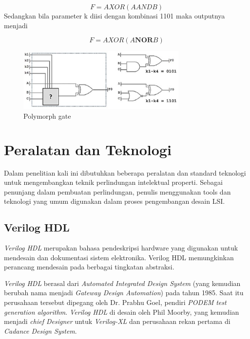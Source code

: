 \begin{equation}
	F = A XOR (A AND B)
\end{equation}
Sedangkan bila parameter k diisi dengan kombinasi 1101 maka outputnya menjadi

\begin{equation}
	F = A XOR (A \textbf{NOR} B)
\end{equation}

\begin{figure}
	\centering
	\includegraphics[width=0.75\textwidth]
	{pics/polymorphgate.png}
	\caption{Polymorph gate\cite{Chen2017a}}
	\label{fig:poly}
\end{figure}

% 

\section{Peralatan dan Teknologi}
Dalam penelitian kali ini dibutuhkan beberapa peralatan dan standard teknologi untuk mengembangkan teknik perlindungan intelektual properti. Sebagai penunjang dalam pembuatan perlindungan, penulis menggunakan tools dan teknologi yang umum digunakan dalam proses pengembangan desain LSI.

\subsection{Verilog HDL}
\textit{Verilog HDL} merupakan bahasa pendeskripsi hardware yang digunakan untuk mendesain dan dokumentasi sistem elektronika. Verilog HDL memungkinkan perancang mendesain pada berbagai tingkatan abstraksi.

\textit{Verilog HDL} berasal dari \textit{Automated Integrated Design System} (yang kemudian berubah nama menjadi \textit{Gateway Design Automation}) pada tahun 1985. Saat itu perusahaan tersebut dipegang oleh Dr. Prabhu Goel, pendiri \textit{PODEM test generation algorithm}. \textit{Verilog HDL} di desain oleh Phil Moorby, yang kemudian menjadi \textit{chief Designer} untuk \textit{Verilog-XL} dan perusahaan rekan pertama di \textit{Cadance Design System}. 

